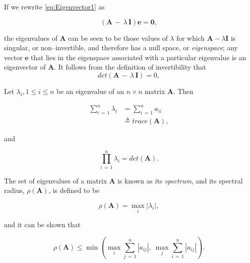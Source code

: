 \documentclass[graybox,envcountchap,sectrefs]{svmono}\usepackage[]{graphicx}\usepackage[]{xcolor}
\begin{document}
\begin{appendices}
If we rewrite \eqref{eq:Eigenvector1} as

\begin{equation}
\left(\mathbf{A}\,-\,\lambda\,\mathrm{\mathbf{I}}\right)\mathrm{\mathbf{e}}=\mathrm{\mathbf{0},}\label{eq:Eigenvector2}
\end{equation}

the eigenvalues of $\mathbf{A}$ can be seen to be those values of
$\lambda$ for which $\mathbf{A}-\lambda\mathrm{\mathbf{I}}$ is singular,
or non--invertible, and therefore has a null space, or \emph{eigenspace};
any vector $\mathbf{e}$ that lies in the eigenspace associated with
a particular eigenvalue is an eigenvector of $\mathrm{\mathbf{A}}$.
It follows from the definition of invertibility that 
\begin{equation}
det\left(\mathbf{A}\,-\,\lambda\,\mathrm{\mathbf{I}}\right)=0,\label{eq:Eigenenvector3}
\end{equation}

Let $\lambda_{i},1\leqslant i\leqslant n$ be an eigenvalue of an
$n\times n$ matrix $\mathrm{\mathbf{A}}$. Then

\begin{align}
\sum_{i\,=\,1}^{n}\lambda_{i} & =\sum_{i\,=\,1}^{n}a_{ii}\nonumber \\
 & \triangleq trace\left(\mathrm{\mathbf{A}}\right),\label{eq:SumOfEigenvalues}
\end{align}

and

\begin{equation}
\prod_{i\,=\,1}^{n}\lambda_{i}=det\left(\mathrm{\mathbf{A}}\right).\label{eq:ProductOfEigenvalues}
\end{equation}

The set of eigenvalues of a matrix $\mathrm{\mathbf{A}}$ is known
as its \emph{spectrum}, and its spectral radius, $\rho\left(\mathbf{A}\right)$,
is defined to be 

\begin{equation}
\rho\left(\mathbf{A}\right)=\max_{i}\left|\lambda_{i}\right|,\label{eq:SpectralRadius1}
\end{equation}

and it can be shown that

\begin{equation}
\rho\left(\mathbf{A}\right)\leqslant\min\left(\max_{i}\sum_{j\,=\,1}^{n}\left|a_{ij}\right|,\ \max_{j}\sum_{i\,=\,1}^{n}\left|a_{ij}\right|\right).\label{eq:SpectralRadius2}
\end{equation}


\end{appendices}
\end{document}
